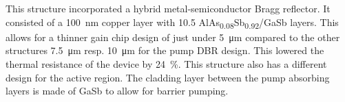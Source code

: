 This structure incorporated a hybrid metal-semiconductor Bragg reflector. It consisted of a  \qty{100}{\nm} copper layer with 10.5 AlAs\textsubscript{0.08}Sb\textsubscript{0.92}/GaSb layers. This allows for a thinner gain chip design of just under \qty{5}{\um} compared to the other structures \qty{7.5}{\um} resp. \qty{10}{\um} for the pump DBR design. This lowered the thermal resistance of the device by \qty{24}{\percent}. This structure also has a different design for the active region. The cladding layer between the pump absorbing layers is made of GaSb to allow for barrier pumping. 